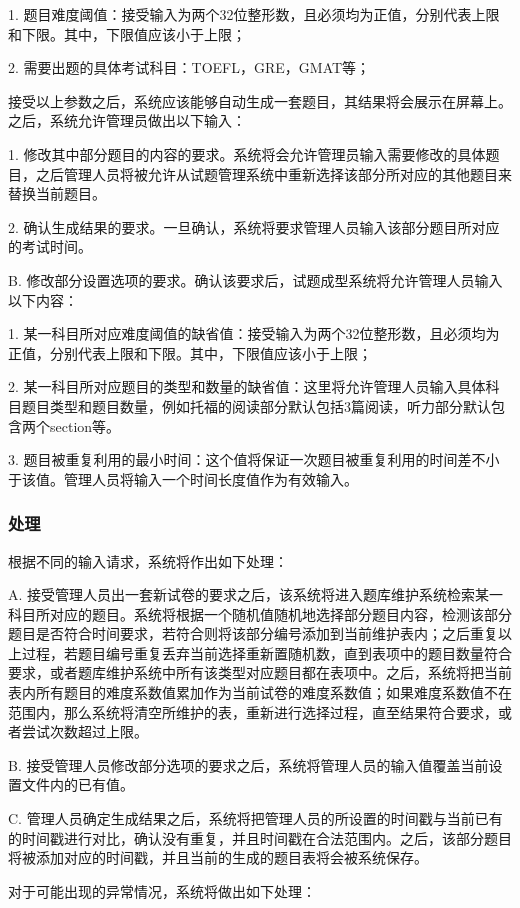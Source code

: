 	1. 题目难度阈值：接受输入为两个32位整形数，且必须均为正值，分别代表上限和下限。其中，下限值应该小于上限；

	2. 需要出题的具体考试科目：TOEFL，GRE，GMAT等；

	接受以上参数之后，系统应该能够自动生成一套题目，其结果将会展示在屏幕上。之后，系统允许管理员做出以下输入：

	1. 修改其中部分题目的内容的要求。系统将会允许管理员输入需要修改的具体题目，之后管理人员将被允许从试题管理系统中重新选择该部分所对应的其他题目来替换当前题目。

	2. 确认生成结果的要求。一旦确认，系统将要求管理人员输入该部分题目所对应的考试时间。

B. 修改部分设置选项的要求。确认该要求后，试题成型系统将允许管理人员输入以下内容：

	1. 某一科目所对应难度阈值的缺省值：接受输入为两个32位整形数，且必须均为正值，分别代表上限和下限。其中，下限值应该小于上限；

	2. 某一科目所对应题目的类型和数量的缺省值：这里将允许管理人员输入具体科目题目类型和题目数量，例如托福的阅读部分默认包括3篇阅读，听力部分默认包含两个section等。

	3. 题目被重复利用的最小时间：这个值将保证一次题目被重复利用的时间差不小于该值。管理人员将输入一个时间长度值作为有效输入。

\subsubsection{处理}
根据不同的输入请求，系统将作出如下处理：

A. 接受管理人员出一套新试卷的要求之后，该系统将进入题库维护系统检索某一科目所对应的题目。系统将根据一个随机值随机地选择部分题目内容，检测该部分题目是否符合时间要求，若符合则将该部分编号添加到当前维护表内；之后重复以上过程，若题目编号重复丢弃当前选择重新置随机数，直到表项中的题目数量符合要求，或者题库维护系统中所有该类型对应题目都在表项中。之后，系统将把当前表内所有题目的难度系数值累加作为当前试卷的难度系数值；如果难度系数值不在范围内，那么系统将清空所维护的表，重新进行选择过程，直至结果符合要求，或者尝试次数超过上限。

B. 接受管理人员修改部分选项的要求之后，系统将管理人员的输入值覆盖当前设置文件内的已有值。

C. 管理人员确定生成结果之后，系统将把管理人员的所设置的时间戳与当前已有的时间戳进行对比，确认没有重复，并且时间戳在合法范围内。之后，该部分题目将被添加对应的时间戳，并且当前的生成的题目表将会被系统保存。

对于可能出现的异常情况，系统将做出如下处理：

